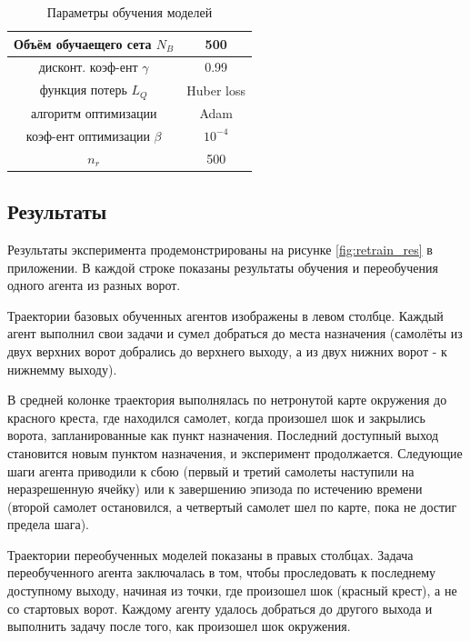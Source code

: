 \begin{table}[h]
    \centering
    \begin{tabular}{|c|c|} 
        \hline
        Объём обучаещего сета $N_B$ & 500 \\ \hline
        дисконт. коэф-ент $\gamma$ & 0.99 \\ \hline
        функция потерь $L_Q$ & Huber loss \\ \hline
        алгоритм оптимизации & Adam \\ \hline
        коэф-ент оптимизации $\beta$ & $10^{-4}$ \\ \hline
        $n_{r}$ & 500 \\
        \hline
    \end{tabular}
    \label{tab:fix_hyp}
    \caption{Параметры обучения моделей}
\end{table}

\subsection{Результаты}


Результаты эксперимента продемонстрированы на рисунке \ref{fig:retrain_res} в приложении.
В каждой строке показаны результаты обучения и переобучения одного агента из разных ворот.

Траектории базовых обученных агентов изображены в левом столбце.
Каждый агент выполнил свои задачи и сумел добраться до места назначения (самолёты из двух верхних ворот добрались до верхнего выходу, 
а из двух нижних ворот - к нижнемму выходу).

В средней колонке траектория выполнялась по нетронутой карте окружения до красного креста, где находился самолет, 
когда произошел шок и закрылись ворота, запланированные как пункт назначения.
Последний доступный выход становится новым пунктом назначения, и эксперимент продолжается.
Следующие шаги агента приводили к сбою (первый и третий самолеты наступили на неразрешенную ячейку) или 
к завершению эпизода по истечению времени (второй самолет остановился, а четвертый самолет шел по карте, пока не достиг предела шага).

Траектории переобученных моделей показаны в правых столбцах.
Задача переобученного агента заключалась в том, чтобы проследовать к последнему доступному выходу,
начиная из точки, где произошел шок (красный крест), а не со стартовых ворот.
Каждому агенту удалось добраться до другого выхода и выполнить задачу после того, как произошел шок окружения.


